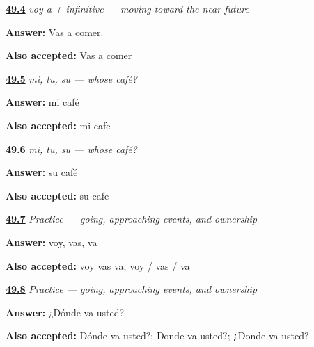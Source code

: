 \noindent\begin{minipage}[t]{\linewidth}
\raggedright
\hyperlink{review-ES-C10-ir-a-futuro-vas-comer}{\textbf{49.4}} \emph{voy a + infinitive — moving toward the near future}\par
\small \textbf{Answer:} Vas a comer.\par
\footnotesize \textbf{Also accepted:} Vas a comer
\end{minipage}\par\medskip

\noindent\begin{minipage}[t]{\linewidth}
\raggedright
\hyperlink{review-ES-C10-mi-tu-su-my-coffee}{\textbf{49.5}} \emph{mi, tu, su — whose café?}\par
\small \textbf{Answer:} mi café\par
\footnotesize \textbf{Also accepted:} mi cafe
\end{minipage}\par\medskip

\noindent\begin{minipage}[t]{\linewidth}
\raggedright
\hyperlink{review-ES-C10-mi-tu-su-formal-your-coffee}{\textbf{49.6}} \emph{mi, tu, su — whose café?}\par
\small \textbf{Answer:} su café\par
\footnotesize \textbf{Also accepted:} su cafe
\end{minipage}\par\medskip

\noindent\begin{minipage}[t]{\linewidth}
\raggedright
\hyperlink{review-ES-C10-practice-ir-forms}{\textbf{49.7}} \emph{Practice — going, approaching events, and ownership}\par
\small \textbf{Answer:} voy, vas, va\par
\footnotesize \textbf{Also accepted:} voy vas va; voy / vas / va
\end{minipage}\par\medskip

\noindent\begin{minipage}[t]{\linewidth}
\raggedright
\hyperlink{review-ES-C10-practice-formal-going}{\textbf{49.8}} \emph{Practice — going, approaching events, and ownership}\par
\small \textbf{Answer:} ¿Dónde va usted?\par
\footnotesize \textbf{Also accepted:} Dónde va usted?; Donde va usted?; ¿Donde va usted?
\end{minipage}\par\medskip

